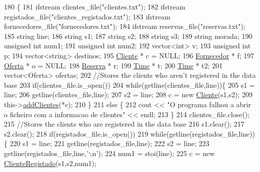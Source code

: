 \begin{DoxyCode}
180                   \{
181     ifstream clientes\_file(\textcolor{stringliteral}{"clientes.txt"});
182     ifstream registados\_file(\textcolor{stringliteral}{"clientes\_registados.txt"});
183     ifstream fornecedores\_file(\textcolor{stringliteral}{"fornecedores.txt"});
184     ifstream reservas\_file(\textcolor{stringliteral}{"reservas.txt"});
185     \textcolor{keywordtype}{string} line;
186     \textcolor{keywordtype}{string} s1;
187     \textcolor{keywordtype}{string} s2;
188     \textcolor{keywordtype}{string} s3;
189     \textcolor{keywordtype}{string} morada;
190     \textcolor{keywordtype}{unsigned} \textcolor{keywordtype}{int} num1;
191     \textcolor{keywordtype}{unsigned} \textcolor{keywordtype}{int} num2;
192     vector<int> v;
193     \textcolor{keywordtype}{unsigned} \textcolor{keywordtype}{int} p;
194     vector<string> destinos;
195     \hyperlink{classCliente}{Cliente} * c = NULL;
196     \hyperlink{classFornecedor}{Fornecedor} * f;
197     \hyperlink{classOferta}{Oferta} * o = NULL;
198     \hyperlink{classReserva}{Reserva} * r;
199     \hyperlink{classTime}{Time} * t;
200     \hyperlink{classTime}{Time} * t2;
201     vector<Oferta> ofertas;
202     \textcolor{comment}{//Stores the clients who aren't registered in the data base}
203     \textcolor{keywordflow}{if}(clientes\_file.is\_open())
204         \textcolor{keywordflow}{while}(getline(clientes\_file,line))\{
205             s1 = line;
206             getline(clientes\_file,line);
207             s2 = line;
208             c = \textcolor{keyword}{new} \hyperlink{classCliente}{Cliente}(s1,s2);
209             this->\hyperlink{classEmpresa_a57597ec4154f274686bc648ccf5d2a59}{addClientes}(*c);
210         \}
211     \textcolor{keywordflow}{else} \{
212         cout << \textcolor{stringliteral}{"O programa falhou a abrir o ficheiro com a informacao de clientes"} << endl;
213     \}
214     clientes\_file.close();
215     \textcolor{comment}{//Stores the clients who are registered in the data base}
216     s1.clear();
217     s2.clear();
218     \textcolor{keywordflow}{if}(registados\_file.is\_open())
219             \textcolor{keywordflow}{while}(getline(registados\_file,line))\{
220                 s1 = line;
221                 getline(registados\_file,line);
222                 s2 = line;
223                 getline(registados\_file,line,\textcolor{charliteral}{'\(\backslash\)n'});
224                 num1 = stoi(line);
225                 c = \textcolor{keyword}{new} \hyperlink{classClienteRegistado}{ClienteRegistado}(s1,s2,num1);

\end{DoxyCode}
